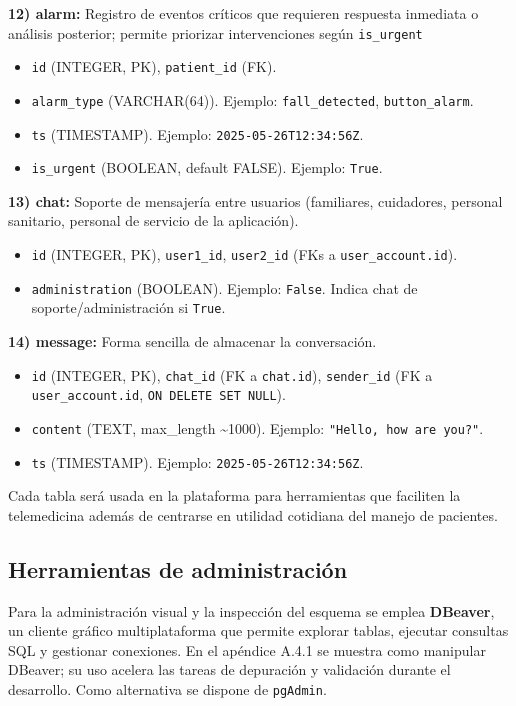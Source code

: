 \documentclass[12pt, a4paper]{article}
\begin{document}
\textbf{12) alarm:} Registro de eventos críticos que requieren respuesta inmediata o análisis posterior; permite priorizar intervenciones según \texttt{is\_urgent}
\begin{itemize}
	\item \texttt{id} (INTEGER, PK), \texttt{patient\_id} (FK).
	\item \texttt{alarm\_type} (VARCHAR(64)). Ejemplo: \texttt{fall\_detected}, \texttt{button\_alarm}.
	\item \texttt{ts} (TIMESTAMP). Ejemplo: \texttt{2025-05-26T12:34:56Z}.
	\item \texttt{is\_urgent} (BOOLEAN, default FALSE). Ejemplo: \texttt{True}.
\end{itemize}


\textbf{13) chat:} Soporte de mensajería entre usuarios (familiares, cuidadores, personal sanitario, personal de servicio de la aplicación). 
\begin{itemize}
	\item \texttt{id} (INTEGER, PK), \texttt{user1\_id}, \texttt{user2\_id} (FKs a \texttt{user\_account.id}).
	\item \texttt{administration} (BOOLEAN). Ejemplo: \texttt{False}. Indica chat de soporte/administración si \texttt{True}.
\end{itemize}


\textbf{14) message:} Forma sencilla de almacenar la conversación.
\begin{itemize}
	\item \texttt{id} (INTEGER, PK), \texttt{chat\_id} (FK a \texttt{chat.id}), \texttt{sender\_id} (FK a \texttt{user\_account.id}, \texttt{ON DELETE SET NULL}).
	\item \texttt{content} (TEXT, max\_length \textasciitilde 1000). Ejemplo: \texttt{"Hello, how are you?"}.
	\item \texttt{ts} (TIMESTAMP). Ejemplo: \texttt{2025-05-26T12:34:56Z}.
\end{itemize}


Cada tabla será usada en la plataforma para herramientas que faciliten la telemedicina además de centrarse en utilidad cotidiana del manejo de pacientes.



\subsection{Herramientas de administración}

Para la administración visual y la inspección del esquema se emplea \textbf{DBeaver}, un cliente gráfico multiplataforma que permite explorar tablas, ejecutar consultas SQL y gestionar conexiones. En el apéndice A.4.1 se muestra como manipular DBeaver; su uso acelera las tareas de depuración y validación durante el desarrollo. Como alternativa se dispone de \texttt{pgAdmin}. \cite{dbeaver_doc,postgresql_doc}
\end{document}
